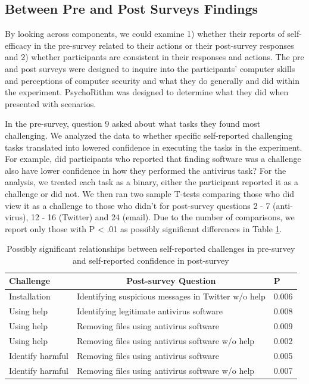 \subsection{Between Pre and Post Surveys Findings}
By looking across components, we could examine 1) whether their reports of self-efficacy in the pre-survey related to their actions or their post-survey responses and 2) whether participants are consistent in their responses and actions. The pre and post surveys were designed to inquire into the participants' computer skills and perceptions of computer security and what they do generally and did within the experiment. PsychoRithm was designed to determine what they did when presented with scenarios.

In the pre-survey, question 9 asked about what tasks they found most challenging. We analyzed the data to whether specific self-reported challenging tasks translated into lowered confidence in executing the tasks in the experiment. For example, did participants who reported that finding software was a challenge also have lower confidence in how they performed the antivirus task? For the analysis, we treated each task as a binary, either the participant reported it as a challenge or did not. We then ran two sample T-tests comparing those who did view it as a challenge to those who didn't for post-survey questions 2 - 7 (anti-virus), 12 - 16 (Twitter) and 24 (email). Due to the number of comparisons, we report only those with P < .01 as possibly significant differences in Table \ref{tab:prepostchallenges}.

\begin{table}[tpb]
\caption{Possibly significant relationships between self-reported challenges in pre-survey and self-reported confidence in post-survey}
\label{tab:prepostchallenges}
\begin{tabular}{|lll|}
\hline
Challenge        & \multicolumn{1}{c}{Post-survey Question}            & P     \\ \hline
Installation     & Identifying suspicious messages in Twitter w/o help & 0.006 \\
Using help       & Identifying legitimate antivirus software           & 0.008 \\
Using help       & Removing files using antivirus software             & 0.009 \\
Using help       & Removing files using antivirus software w/o help    & 0.002 \\
Identify harmful & Removing files using antivirus software             & 0.005 \\
Identify harmful & Removing files using antivirus software w/o help    & 0.007 \\ \hline
\end{tabular}
\end{table}


